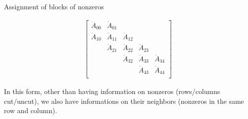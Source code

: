 \begin{frame}{Assignment of blocks of nonzeros}
\begin{minipage}{4cm}
{	\begin{align*}
	\begin{bmatrix}
		\ddot{A}_{00} & \ddot{A}_{01} & & & \\
		\ddot{A}_{10} & \ddot{A}_{11} & \ddot{A}_{12} & & \\
		& \ddot{A}_{21} & \ddot{A}_{22} & \ddot{A}_{23} & \\
		& & \ddot{A}_{32} & \ddot{A}_{33} & \ddot{A}_{34} \\
		& & & \ddot{A}_{43} & \ddot{A}_{44} \\
	\end{bmatrix}
\end{align*}
}

\end{minipage}

\vspace{0.4cm}

In this form, other than having information on nonzeros (rows/columns cut/uncut), we also have informations on their neighbors (nonzeros in the same row and column).

\end{frame}



